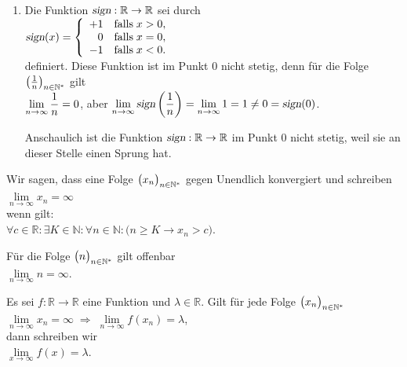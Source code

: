 \begin{enumerate}
\item Die Funktion $\textsl{sign}:\mathbb{R} \rightarrow \mathbb{R}$ sei durch
      \\[0.2cm]
      \hspace*{1.3cm}      
      $\textsl{sign}(x) = \left\{
       \begin{array}{rl}
        +1 & \mbox{falls}\; x > 0, \\
         0 & \mbox{falls}\; x = 0, \\
        -1 & \mbox{falls}\; x < 0. \\
       \end{array}\right.
      $
      \\[0.2cm]
      definiert. Diese Funktion ist im Punkt $0$ nicht stetig, denn f\"ur die Folge
      $\bigl(\frac{1}{n}\bigr)_{n\in\mathbb{N}^*}$ gilt
      \\[0.2cm]
      \hspace*{1.3cm}      
      $\displaystyle \lim\limits_{n\rightarrow\infty} \frac{1}{n} = 0$, \quad aber \quad
      $\displaystyle \lim\limits_{n\rightarrow\infty} \textsl{sign}\left(\frac{1}{n}\right) =
       \lim\limits_{n\rightarrow\infty} 1 = 1 \not= 0 = \textsl{sign}(0)$. 

       Anschaulich ist die Funktion $\textsl{sign}:\mathbb{R} \rightarrow \mathbb{R}$  im Punkt
       0 nicht stetig, weil sie an dieser Stelle einen Sprung hat.
       \eox
\end{enumerate}

\begin{Definition}
Wir sagen, dass eine Folge  $\bigl(x_n\bigr)_{n\in\mathbb{N}^*}$ gegen Unendlich konvergiert und schreiben 
\\[0.2cm]
\hspace*{1.3cm}      
$\lim\limits_{n\rightarrow\infty} x_n = \infty$
\\[0.2cm]
wenn gilt:
\\[0.2cm]
\hspace*{1.3cm}      
$\forall c \in \mathbb{R}: \exists K \in \mathbb{N}: \forall n \in \mathbb{N}: \bigl(n \geq K \rightarrow x_n > c\bigr)$.
\eod
\end{Definition}

\example  
F\"ur die Folge $\bigl(n\bigr)_{n\in\mathbb{N}^*}$ gilt offenbar 
\\[0.2cm]
\hspace*{1.3cm}      
$\lim\limits_{n\rightarrow\infty} n = \infty$.
\eox

\begin{Definition}
Es sei $f:\mathbb{R} \rightarrow \mathbb{R}$ eine Funktion und $\lambda\in \mathbb{R}$.
Gilt f\"ur jede Folge $\bigl(x_n\bigr)_{n\in\mathbb{N}^*}$
\\[0.2cm]
\hspace*{1.3cm}      
$\lim\limits_{n\rightarrow\infty} x_n = \infty \;\Rightarrow\;
     \lim\limits_{n\rightarrow\infty} f(x_n) = \lambda$,
\\[0.2cm]
dann schreiben wir 
\\[0.2cm]
\hspace*{1.3cm}      
$\lim\limits_{x\rightarrow\infty} f(x) = \lambda$.
\eod
\end{Definition}

